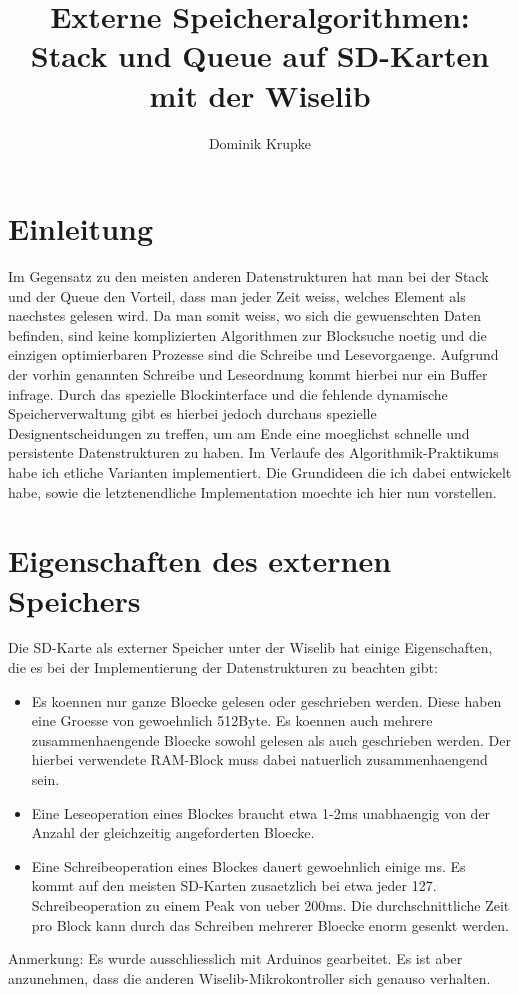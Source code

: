 \documentclass[10pt,a4paper]{article}
\begin{document}
\title{Externe Speicheralgorithmen: Stack und Queue auf SD-Karten mit der Wiselib}
\author{Dominik Krupke}
\maketitle
\section{Einleitung}
Im Gegensatz zu den meisten anderen Datenstrukturen hat man bei der Stack und der Queue den Vorteil, dass man jeder Zeit weiss, welches Element als naechstes gelesen wird. Da man somit weiss, wo sich die gewuenschten Daten befinden, sind keine komplizierten Algorithmen zur Blocksuche noetig und die einzigen optimierbaren Prozesse sind die Schreibe und Lesevorgaenge. Aufgrund der vorhin genannten Schreibe und Leseordnung kommt hierbei nur ein Buffer infrage. Durch das spezielle Blockinterface und die fehlende dynamische Speicherverwaltung gibt es hierbei jedoch durchaus spezielle Designentscheidungen zu treffen, um am Ende eine moeglichst schnelle und persistente Datenstrukturen zu haben. Im Verlaufe des Algorithmik-Praktikums habe ich etliche Varianten implementiert. Die Grundideen die ich dabei entwickelt habe, sowie die letztenendliche Implementation moechte ich hier nun vorstellen.
\section{Eigenschaften des externen Speichers}
Die SD-Karte als externer Speicher unter der Wiselib hat einige Eigenschaften, die es bei der Implementierung der Datenstrukturen zu beachten gibt:
\begin{itemize}
\item Es koennen nur ganze Bloecke gelesen oder geschrieben werden. Diese haben eine Groesse von gewoehnlich 512Byte. Es koennen auch mehrere zusammenhaengende Bloecke sowohl gelesen als auch geschrieben werden. Der hierbei verwendete RAM-Block muss dabei natuerlich zusammenhaengend sein.
\item Eine Leseoperation eines Blockes braucht etwa 1-2ms unabhaengig von der Anzahl der gleichzeitig angeforderten Bloecke.
\item Eine Schreibeoperation eines Blockes dauert gewoehnlich einige ms. Es kommt auf den meisten SD-Karten zusaetzlich bei etwa jeder 127. Schreibeoperation zu einem Peak von ueber 200ms. Die durchschnittliche Zeit pro Block kann durch das Schreiben mehrerer Bloecke enorm  gesenkt werden.
\end{itemize} 
Anmerkung: Es wurde ausschliesslich mit Arduinos gearbeitet. Es ist aber anzunehmen, dass die anderen Wiselib-Mikrokontroller sich genauso verhalten.
\end{document}
